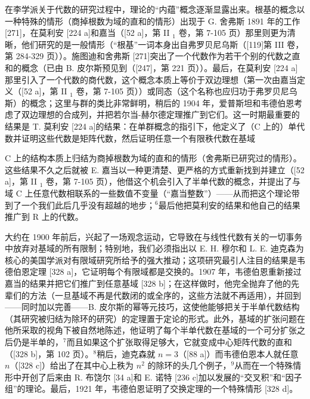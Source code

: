 在李学派关于代数的研究过程中，理论的“内蕴”概念逐渐显露出来。根基的概念以一种特殊的情形（商掉根数为域的直和的情形）出现于 G. 舍弗斯 1891 年的工作 {[}271{]}，在莫利安 {[}224 a{]}和嘉当（{[}52 a{]}，第 II \(_{1}\) 卷，第 7-105 页）那里则更为清晰，他们研究的是一般情形（“根基”一词本身出自弗罗贝尼乌斯（{[}119{]}第 III 卷，第 284-329 页））。施图迪和舍弗斯 {[}271{]}突出了一个代数作为若干个别的代数之直和的概念（已由 B. 皮尔斯预见到（{[}247{]}，第 221 页））。最后，在莫利安 {[}224 a{]}那里引入了一个代数的商代数，这个概念本质上等价于双边理想（第一次由嘉当定义（{[}52 a{]}，第 II \(_{1}\) 卷，第 7-105 页））或同态（这个名称也应归功于弗罗贝尼乌斯）的概念；这里与群的类比非常鲜明，稍后的 1904 年，爱普斯坦和韦德伯恩考虑了双边理想的合成列，并把若尔当-赫尔德定理推广到它们。这一时期最重要的结果是 T. 莫利安 {[}224 a{]}的结果：在单群概念的指引下，他定义了（C 上的）单代数并证明这些代数是矩阵代数，然后证明任意一个有限秩代数在基域

C 上的结构本质上归结为商掉根数为域的直和的情形（舍弗斯已研究过的情形）。这些结果不久之后就被 E. 嘉当以一种更清楚、更严格的方式重新找到并建立（{[}52 a{]}，第 II \(_{1}\) 卷，第 7-105 页），他借这个机会引入了半单代数的概念，并提出了与域 C 上任意代数相联系的一些数值不变量（“嘉当整数”）——从而把这个理论带到了一个我们此后几乎没有超越的地步；\(^{6}\)最后他把莫利安的结果和他自己的结果推广到 R 上的代数。

大约在 1900 年前后，兴起了一场观念运动，它导致在与线性代数有关的一切事务中放弃对基域的所有限制；特别地，我们必须指出以 E. H. 穆尔和 L. E. 迪克森为核心的美国学派对有限域研究所给予的强大推动；这项研究最引人注目的结果是韦德伯恩定理 {[}328 a{]}，它证明每个有限域都是交换的。1907 年，韦德伯恩重新接过嘉当的结果并把它们推广到任意基域 {[}328 b{]}；在这样做时，他完全抛弃了他的先辈们的方法（一旦基域不再是代数闭的或全序的，这些方法就不再适用），并回到——同时加以完善——B. 皮尔斯的幂等元技巧，这使他能够把关于半单代数结构（其研究被归结为除环的研究）的定理置于定论的形式。此外，基域的扩张问题在他所采取的视角下被自然地陈述，他证明了每个半单代数在基域的一个可分扩张之后仍是半单的，\(^{7}\)而且如果这个扩张取得足够大，它就变成中心矩阵代数的直和（{[}328 b{]}，第 102 页）。\(^{8}\)稍后，迪克森就 \(n = 3\)（{[}88 a{]}）而韦德伯恩本人就任意 \(n\)（{[}328 c{]}）给出了在其中心上秩为 \(n^{2}\) 的除环的头几个例子，\(^{9}\)从而在一个特殊情形中开创了后来由 R. 布饶尔 {[}34 a{]}和 E. 诺特 {[}236 c{]}加以发展的“交叉积”和“因子组”的理论。最后，1921 年，韦德伯恩证明了交换定理的一个特殊情形 {[}328 d{]}。


